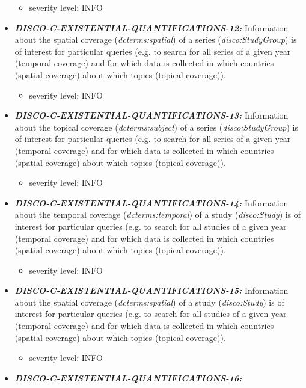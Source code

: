 \documentclass{llncs}
\begin{document}
\begin{itemize}
	\begin{itemize}
		\item severity level: INFO
	\end{itemize}
	\item \textbf{{\em DISCO-C-EXISTENTIAL-QUANTIFICATIONS-12:}} 
  Information about the spatial coverage (\emph{dcterms:spatial}) of a series (\emph{disco:StudyGroup}) is of interest for particular queries 
	(e.g. to search for all series of a given year (temporal coverage) and for which data is collected in which countries (spatial coverage) about which topics (topical coverage)).
	\begin{itemize}
		\item severity level: INFO
	\end{itemize}
	\item \textbf{{\em DISCO-C-EXISTENTIAL-QUANTIFICATIONS-13:}} 
  Information about the topical coverage (\emph{dcterms:subject}) of a series (\emph{disco:StudyGroup}) is of interest for particular queries 
	(e.g. to search for all series of a given year (temporal coverage) and for which data is collected in which countries (spatial coverage) about which topics (topical coverage)).
	\begin{itemize}
		\item severity level: INFO
	\end{itemize}
	\item \textbf{{\em DISCO-C-EXISTENTIAL-QUANTIFICATIONS-14:}} 
  Information about the temporal coverage (\emph{dcterms:temporal}) of a study (\emph{disco:Study}) is of interest for particular queries 
	(e.g. to search for all studies of a given year (temporal coverage) and for which data is collected in which countries (spatial coverage) about which topics (topical coverage)).
	\begin{itemize}
		\item severity level: INFO
	\end{itemize}
	\item \textbf{{\em DISCO-C-EXISTENTIAL-QUANTIFICATIONS-15:}} 
  Information about the spatial coverage (\emph{dcterms:spatial}) of a study (\emph{disco:Study}) is of interest for particular queries 
	(e.g. to search for all studies of a given year (temporal coverage) and for which data is collected in which countries (spatial coverage) about which topics (topical coverage)).
	\begin{itemize}
		\item severity level: INFO
	\end{itemize}
	\item \textbf{{\em DISCO-C-EXISTENTIAL-QUANTIFICATIONS-16:}} 

\end{itemize}
\end{document}
